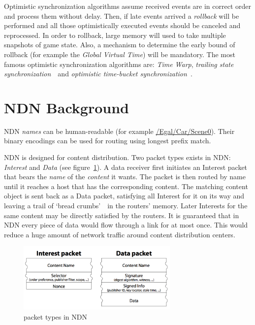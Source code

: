 Optimistic synchronization algorithms assume received events are in correct order and process them without delay. Then, if late events arrived a \emph{rollback} will be performed and all those optimistically executed events should be canceled and reprocessed. In order to rollback, large memory will used to take multiple snapshots of game state. Also, a mechanism to determine the early bound of rollback (for example the \emph{Global Virtual Time}) will be mandatory. The most famous optimistic synchronization algorithms are: \emph{Time Warp}, \emph{trailing state synchronization}~\cite{Csync}~and \emph{optimistic time-bucket synchronization}~\cite{Doptbkt}.

\section{NDN Background}
\label{ndnbg}

NDN \emph{names} can be human-readable (for example \url{/Egal/Car/Scene0}). Their binary encodings can be used for routing using longest prefix match.

NDN is designed for content distribution. Two packet types exists in NDN: \emph{Interest} and \emph{Data} (see figure~\ref{packet_types}). A data receiver first initiates an Interest packet that bears the \emph{name} of the \emph{content} it wants. The packet is then routed by name until it reaches a host that has the corresponding content. The matching content object is sent back as a Data packet, satisfying all Interest for it on its way and leaving a trail of `bread crumbs'~\cite{Jndn}~in the routers' memory. Later Interests for the same content may be directly satisfied by the routers. It is guaranteed that in NDN every piece of data would flow through a link for at most once. This would reduce a huge amount of network traffic around content distribution centers.

\begin{figure} 
\begin{center}
\includegraphics[width=0.7\textwidth] {images/packet_types}
\caption{packet types in NDN}
\label{packet_types}
\end{center}
\end{figure}


